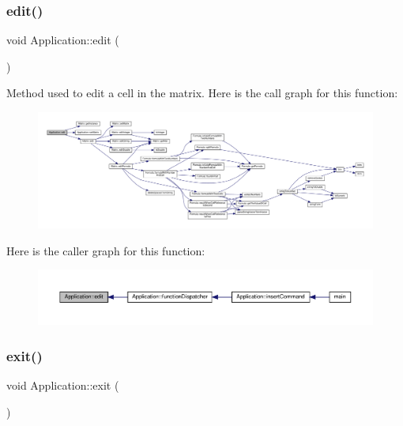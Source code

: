 \subsubsection{\texorpdfstring{edit()}{edit()}}
{\footnotesize\ttfamily void Application\+::edit (\begin{DoxyParamCaption}{ }\end{DoxyParamCaption})\hspace{0.3cm}{\ttfamily [private]}}

Method used to edit a cell in the matrix. Here is the call graph for this function\+:
\nopagebreak
\begin{figure}[H]
\begin{center}
\leavevmode
\includegraphics[width=350pt]{class_application_a4b193bf9c8be7105e89a2323ea77b1f4_cgraph}
\end{center}
\end{figure}
Here is the caller graph for this function\+:
\nopagebreak
\begin{figure}[H]
\begin{center}
\leavevmode
\includegraphics[width=350pt]{class_application_a4b193bf9c8be7105e89a2323ea77b1f4_icgraph}
\end{center}
\end{figure}
\mbox{\label{class_application_a3c8a98d6c10a5b054800488df16cdbcb}} 
\subsubsection{\texorpdfstring{exit()}{exit()}}
{\footnotesize\ttfamily void Application\+::exit (\begin{DoxyParamCaption}{ }\end{DoxyParamCaption})\hspace{0.3cm}{\ttfamily [private]}}


